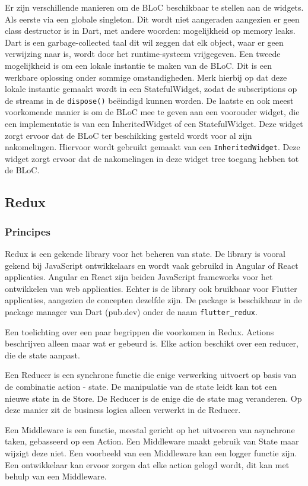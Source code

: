 Er zijn verschillende manieren om de BLoC beschikbaar te stellen aan de widgets. 
Als eerste via een globale singleton. Dit wordt niet aangeraden aangezien er geen class destructor is in Dart, met andere woorden: mogelijkheid op memory leaks. Dart is een garbage-collected taal dit wil zeggen dat elk object, waar er geen verwijzing naar is, wordt door het runtime-systeem vrijgegeven. 
Een tweede mogelijkheid is om een lokale instantie te maken van de BLoC. Dit is een werkbare oplossing onder sommige omstandigheden. Merk hierbij op dat deze lokale instantie gemaakt wordt in een StatefulWidget, zodat de subscriptions op de streams in de \verb|dispose()| beëindigd kunnen worden.
De laatste en ook meest voorkomende manier is om de BLoC mee te geven aan een voorouder widget, die een implementatie is van een InheritedWidget of een StatefulWidget. Deze widget zorgt ervoor dat de BLoC ter beschikking gesteld wordt voor al zijn nakomelingen. Hiervoor wordt gebruikt gemaakt van een \verb|InheritedWidget|. Deze widget zorgt ervoor dat de nakomelingen in deze widget tree toegang hebben tot de BLoC.

\subsection{Redux}
\label{ch:redux}
\subsubsection{Principes}
Redux is een gekende library voor het beheren van state. De library is vooral gekend bij JavaScript ontwikkelaars en wordt vaak gebruikd in Angular of React applicaties. Angular en React zijn beiden JavaScript frameworks voor het ontwikkelen van web applicaties. Echter is de library ook bruikbaar voor Flutter applicaties, aangezien de concepten dezelfde zijn. De package is beschikbaar in de package manager van Dart (pub.dev) onder de naam \verb|flutter_redux|.

Een toelichting over een paar begrippen die voorkomen in Redux.
Actions beschrijven alleen maar wat er gebeurd is. Elke action beschikt over een reducer, die de state aanpast.

Een Reducer is een synchrone functie die enige verwerking uitvoert op basis van de combinatie action - state. De manipulatie van de state leidt kan tot een nieuwe state in de Store. De Reducer is de enige die de state mag veranderen. Op deze manier zit de business logica alleen verwerkt in de Reducer. 

Een Middleware is een functie, meestal gericht op het uitvoeren van asynchrone taken, gebasseerd op een Action. Een Middleware maakt gebruik van State maar wijzigt deze niet. Een voorbeeld van een Middleware kan een logger functie zijn. Een ontwikkelaar kan ervoor zorgen dat elke action gelogd wordt, dit kan met behulp van een Middleware.

